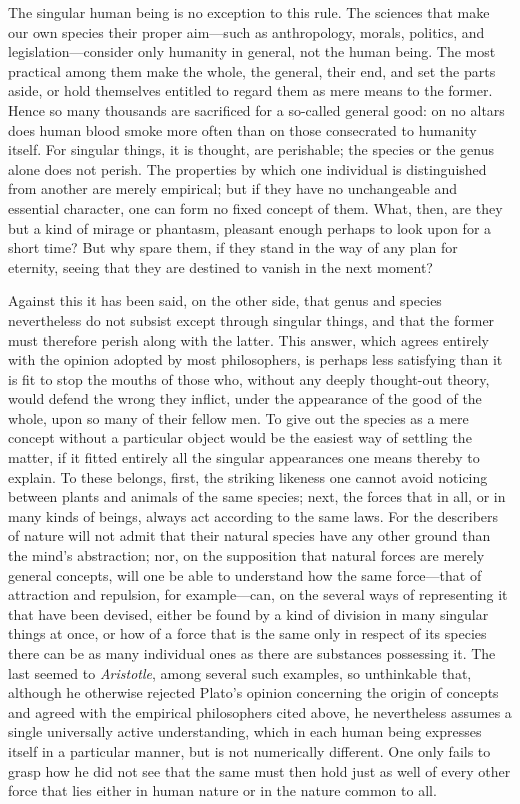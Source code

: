 \documentclass[12pt,a4paper]{article}
\begin{document}
The singular human being is no exception to this rule. The sciences that make
our own species their proper aim---such as anthropology, morals, politics, and
legislation---consider only humanity in general, not the human being. The most
practical among them make the whole, the general, their end, and set the parts
aside, or hold themselves entitled to regard them as mere means to the former.
Hence so many thousands are sacrificed for a so-called general good: on no
altars does human blood smoke more often than on those consecrated to humanity
itself. For singular things, it is thought, are perishable; the species or the
genus alone does not perish. The properties by which one individual is
distinguished from another are merely empirical; but if they have no
unchangeable and essential character, one can form no fixed concept of them.
What, then, are they but a kind of mirage or phantasm, pleasant enough perhaps
to look upon for a short time? But why spare them, if they stand in the way of
any plan for eternity, seeing that they are destined to vanish in the next
moment?

Against this it has been said, on the other side, that genus and species
nevertheless do not subsist except through singular things, and that the former
must therefore perish along with the latter. This answer, which agrees entirely
with the opinion adopted by most philosophers, is perhaps less satisfying than
it is fit to stop the mouths of those who, without any deeply thought-out
theory, would defend the wrong they inflict, under the appearance of the good of
the whole, upon so many of their fellow men. To give out the species as a mere
concept without a particular object would be the easiest way of settling the
matter, if it fitted entirely all the singular appearances one means thereby to
explain. To these belongs, first, the striking likeness one cannot avoid
noticing between plants and animals of the same species; next, the forces that
in all, or in many kinds of beings, always act according to the same laws. For
the describers of nature will not admit that their natural species have any
other ground than the mind's abstraction; nor, on the supposition that natural
forces are merely general concepts, will one be able to understand how
the same force---that of attraction and repulsion, for example---can, on the
several ways of representing it that have been devised, either be found by a
kind of division in many singular things at once, or how of a force that is the
same only in respect of its species there can be as many individual ones as
there are substances possessing it. The last seemed to \emph{Aristotle}, among
several such examples, so unthinkable that, although he otherwise rejected
Plato's opinion concerning the origin of concepts and agreed with the empirical
philosophers cited above, he nevertheless assumes a single universally active
understanding, which in each human being expresses itself in a particular
manner, but is not numerically different. One only fails to grasp how he did not
see that the same must then hold just as well of every other force that lies
either in human nature or in the nature common to all.
\end{document}
